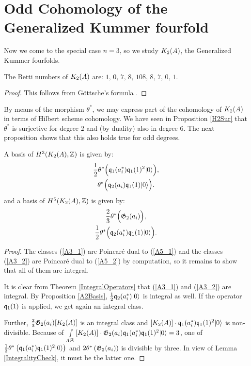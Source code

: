 \section{Odd Cohomology of the Generalized Kummer fourfold}
Now we come to the special case $n=3$, so we study $\kum{A}{2}$, the Generalized Kummer fourfolds.
\begin{proposition}
The Betti numbers of $\kum{A}{2}$ are:
$
1,\,0,\,7,\,8,\,108,\,8,\,7,\,0,\,1.
$
\end{proposition}
\begin{proof}
This follows from G\"ottsche's formula \cite[page 49]{Gottsche}.
\end{proof}

By means of the morphism $\theta^*$, we may express part of the cohomology of $\kum{A}{2}$ in terms of Hilbert scheme cohomology. We have seen in Proposition \ref{H2Sur} that $\theta^*$ is surjective for degree $2$ and (by duality) also in degree $6$. 
The next proposition shows that this also holds true for odd degrees.
\begin{proposition}
A basis of $H^3(\X,\Z)$ is given by:
\begin{gather}
\label{A3_1}
\frac{1}{2}\theta^*\Big( \q_1(a^*_i)\q_1(1)^2\vac \Big), \\
\label{A3_2}
\theta^*\Big(\q_2(a_i)\q_1(1)\vac\Big).
\end{gather}
and a basis of $H^5(\X,\Z)$ is given by:
\begin{gather}
\label{A5_1}
\frac{2}{3} \theta^*\Big( \G_2(a_i) \Big), \\
\label{A5_2}
\frac{1}{2}\theta^*\Big( \q_2(a^*_i)\q_1(1)\vac \Big).
\end{gather}
\end{proposition}
\begin{proof}
The classes (\ref{A3_1}) are Poincar\'e dual to (\ref{A5_1}) and the classes (\ref{A3_2}) are Poincar\'e dual to (\ref{A5_2}) by computation, so it remains to show that all of them are integral.

It is clear from Theorem \ref{IntegralOperators} that (\ref{A3_1}) and (\ref{A3_2}) are integral. By Proposition \ref{A2Basis}, $\frac{1}{2}\q_2(a^*_i)\vac$ is integral as well. If the operator $ \q_1(1)$ is applied, we get again an integral class.

Further, $\frac{2}{3} \G_2(a_i)[\kum{A}{2}]$ is an integral class and $[\kum{A}{2}]\cdot\q_1(a^*_i)\q_1(1)^2\vac$ is non-divisible. 
Because of $\int\limits_{A\hilb{3}} [\kum{A}{2}]\cdot \G_2(a_i)  \q_1(a^*_i)\q_1(1)^2\vac = 3$, one of $\frac{1}{2}\theta^*\left( \q_1(a^*_i)\q_1(1)^2\vac \right)$ and $ 2\theta^*\left( \G_2(a_i) \right)$ is divisible by three. In view of Lemma \ref{IntegralityCheck}, it must be the latter one.
\end{proof}



